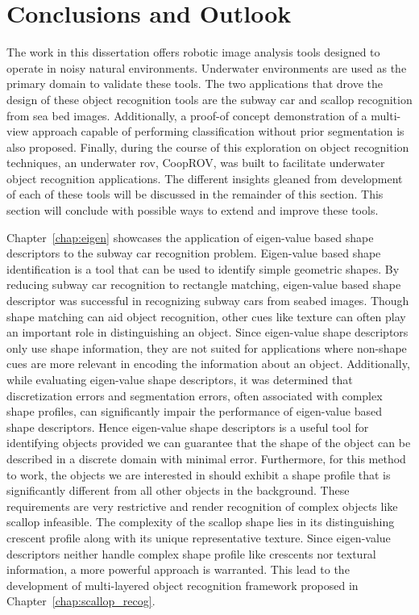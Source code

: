
\chapter{Conclusions and Outlook}
\label{chap:thesis_conclusion}


The work in this dissertation offers robotic image analysis tools designed to operate in noisy natural environments. 
Underwater environments are used as the primary domain to validate these tools.
The two applications that drove the design of these object recognition tools are the subway car and scallop recognition from sea bed images.
Additionally, a proof-of concept demonstration of a multi-view approach capable of performing classification without prior segmentation is also proposed.
Finally, during the course of this exploration on object recognition techniques, an underwater \gls{rov}, CoopROV, was built to facilitate underwater object recognition applications. The different insights gleaned from development of each of these tools will be discussed in the remainder of this section. This section will conclude with possible ways to extend and improve these tools.

Chapter~\ref{chap:eigen} showcases the application of eigen-value based shape descriptors to the subway car recognition problem. 
Eigen-value based shape identification is a tool that can be used to identify simple geometric shapes. 
By reducing subway car recognition to rectangle matching, eigen-value based shape descriptor was
successful in recognizing subway cars from seabed images.
Though shape matching can aid object recognition, other cues like texture can often play an important role
in distinguishing an object. Since eigen-value shape descriptors only use shape information, 
they are not suited for applications where non-shape cues are more relevant in encoding the information about an object. 
Additionally, while evaluating eigen-value shape descriptors, it was determined that 
discretization errors and segmentation errors, often associated with
complex shape profiles, can significantly impair the performance of eigen-value based shape descriptors.
Hence eigen-value shape descriptors is a useful tool for identifying
objects provided we can guarantee that the shape of the object can be described in a
discrete domain with minimal error. Furthermore, for this method to work, the objects
we are interested in should exhibit a shape profile that is significantly different from
all other objects in the background. These requirements are very restrictive and render recognition of complex objects like scallop infeasible. 
The complexity of the scallop shape lies in its distinguishing crescent profile along with its unique representative texture.
Since eigen-value descriptors neither handle complex shape profile like crescents nor textural information,
a more powerful approach is warranted.
This lead to the development of multi-layered object recognition framework proposed in Chapter~\ref{chap:scallop_recog}.

